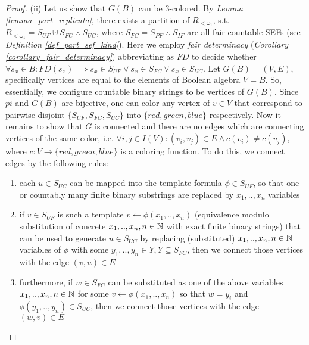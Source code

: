 \begin{proof}
  (ii) Let us show that $G(B)$ can be 3-colored. By \textit{Lemma \ref{lemma_part_replicata}}, there exists a partition of $R_{<\omega_1}$, s.t. $R_{<\omega_1} = S_{UF} \cupdot S_{FC} \cupdot S_{UC}$, where $S_{FC} = S_{PF} \cupdot S_{IF}$ are all fair countable SEFs (see \textit{Definition \ref{def_part_sef_kind}}). Here we employ \textit{fair determinacy} (\textit{Corollary \ref{corollary_fair_determinacy}}) abbreviating as $FD$ to decide whether $\forall s_x \in B: FD(s_x) \implies s_x \in S_{UF} \lor s_x \in S_{FC} \lor s_x \in S_{UC}$. Let $G(B) = (V, E)$, specifically vertices are equal to the elements of Boolean algebra $V = B$. So, essentially, we configure countable binary strings to be vertices of $G(B)$. Since $pi$ and $G(B)$ are bijective, one can color any vertex of $v \in V$ that correspond to pairwise disjoint $\{S_{UF}, S_{FC}, S_{UC}\}$ into $\{red, green, blue\}$ respectively. Now it remains to show that $G$ is connected and there are no edges which are connecting vertices of the same color, i.e. $\forall i,j \in I(V): (v_i,v_j) \in E \land c(v_i) \neq c(v_j)$, where $c: V \to \{red, green, blue\}$ is a coloring function. To do this, we connect edges by the following rules:
  \begin{enumerate}[label=(\alph*)]
    \item each $u \in S_{UC}$ can be mapped into the template formula $\phi \in S_{UF}$, so that one or countably many finite binary substrings are replaced by $x_1,..,x_n$ variables
    \item if $v \in S_{UF}$ is such a template $v \leftarrow \phi(x_1, .., x_n)$ (equivalence modulo substitution of concrete $x_1,..,x_n, n \in \mathbb{N}$ with exact finite binary strings) that can be used to generate $u \in S_{UC}$ by replacing (substituted) $x_1,..,x_n, n \in \mathbb{N}$ variables of $\phi$ with some $y_1,..,y_n \in Y, Y \subseteq S_{FC}$, then we connect those vertices with the edge $(v, u) \in E$
    \item furthermore, if $w \in S_{FC}$ can be substituted as one of the above variables $x_1,..,x_n, n \in \mathbb{N}$ for some $v \leftarrow \phi(x_1, .., x_n)$ so that $w = y_i$ and $\phi(y_1, .., y_n) \in S_{UC}$, then we connect those vertices with the edge $(w, v) \in E$
  \end{enumerate}

\end{proof}
